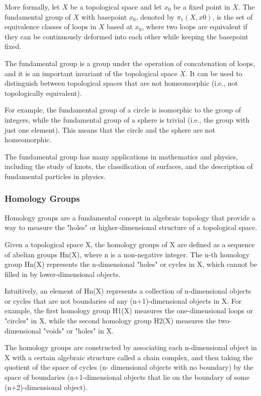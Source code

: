 \documentclass{IEEEcsmag}
\begin{document}
        More formally, let $X$ be a topological space and let $x_0$ be a fixed point in $X$. The fundamental 
        group of $X$ with basepoint $x_0$, denoted by $\pi_1(X, x0)$, is the set of equivalence classes of loops 
        in $X$ based at $x_0$, where two loops are equivalent if they can be continuously deformed into each 
        other while keeping the basepoint fixed.

        The fundamental group is a group under the operation of concatenation of loops, and it is an important 
        invariant of the topological space $X$. It can be used to distinguish between topological spaces that are 
        not homeomorphic (i.e., not topologically equivalent).

        For example, the fundamental group of a circle is isomorphic to the group of integers, while the 
        fundamental group of a sphere is trivial (i.e., the group with just one element). This means that the 
        circle and the sphere are not homeomorphic.

        The fundamental group has many applications in mathematics and physics, including the study of knots, the 
        classification of surfaces, and the description of fundamental particles in physics.

      \subsubsection{Homology Groups}
        Homology groups are a fundamental concept in algebraic topology that provide a way to measure the "holes" 
        or higher-dimensional structure of a topological space.

        Given a topological space X, the homology groups of X are defined as a sequence of abelian groups Hn(X), 
        where n is a non-negative integer. The n-th homology group Hn(X) represents the n-dimensional "holes" or 
        cycles in X, which cannot be filled in by lower-dimensional objects.

        Intuitively, an element of Hn(X) represents a collection of n-dimensional objects or cycles that are not 
        boundaries of any (n+1)-dimensional objects in X. For example, the first homology group H1(X) measures 
        the one-dimensional loops or "circles" in X, while the second homology group H2(X) measures the two-
        dimensional "voids" or "holes" in X.

        The homology groups are constructed by associating each n-dimensional object in X with a certain 
        algebraic structure called a chain complex, and then taking the quotient of the space of cycles (n-
        dimensional objects with no boundary) by the space of boundaries (n+1-dimensional objects that lie on the 
        boundary of some (n+2)-dimensional object).
\end{document}
